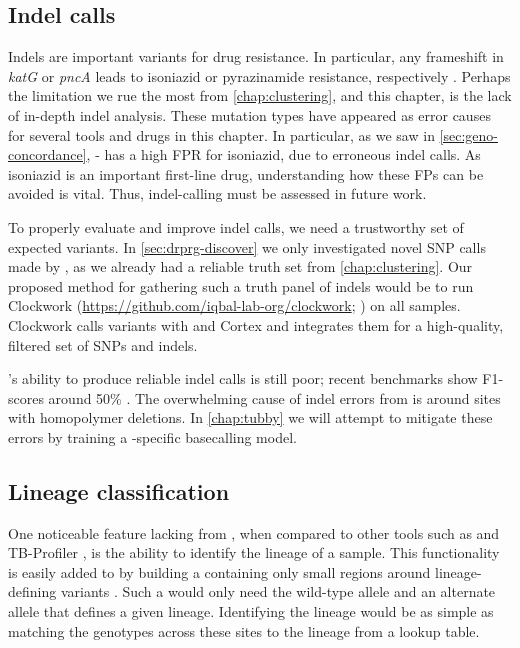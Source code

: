 \subsection{Indel calls}
\label{sec:indel-dst-fw}
Indels are important variants for \mtb{} drug resistance. In particular, any frameshift in \textit{katG} or \textit{pncA} leads to isoniazid or pyrazinamide resistance, respectively \cite{miotto2017}. Perhaps the limitation we rue the most from \autoref{chap:clustering}, and this chapter, is the lack of in-depth indel analysis. These mutation types have appeared as error causes for several tools and drugs in this chapter. In particular, as we saw in \autoref{sec:geno-concordance}, \mykrobe{}-\ont{} has a high FPR for isoniazid, due to erroneous indel calls. As isoniazid is an important first-line drug, understanding how these FPs can be avoided is vital. Thus, indel-calling must be assessed in future work.

To properly evaluate and improve indel calls, we need a trustworthy set of expected variants. In \autoref{sec:drprg-discover} we only investigated novel SNP calls made by \drprg{}, as we already had a reliable truth set from \autoref{chap:clustering}. Our proposed method for gathering such a truth panel of indels would be to run Clockwork (\url{https://github.com/iqbal-lab-org/clockwork}; \cite{minos}) on all samples. Clockwork calls variants with  and Cortex and integrates them for a high-quality, filtered set of SNPs and indels.

\ont{}'s ability to produce reliable indel calls is still poor; recent benchmarks show F1-scores around 50\% \cite{clairvoyant2019}. The overwhelming cause of indel errors from \ont{} is around sites with homopolymer deletions. In \autoref{chap:tubby} we will attempt to mitigate these errors by training a \mtb{}-specific \ont{} basecalling model.

\subsection{Lineage classification}

One noticeable feature lacking from \drprg{}, when compared to other tools such as \mykrobe{} and TB-Profiler \cite{phelan2019}, is the ability to identify the lineage of a sample. This functionality is easily added to \drprg{} by building a \panrg{} containing only small regions around lineage-defining variants \cite{Shitikov2017,Rutaihwa2019,stucki2016,Freschi2020}. Such a \panrg{} would only need the wild-type allele and an alternate allele that defines a given lineage. Identifying the lineage would be as simple as matching the genotypes across these sites to the lineage from a lookup table.

